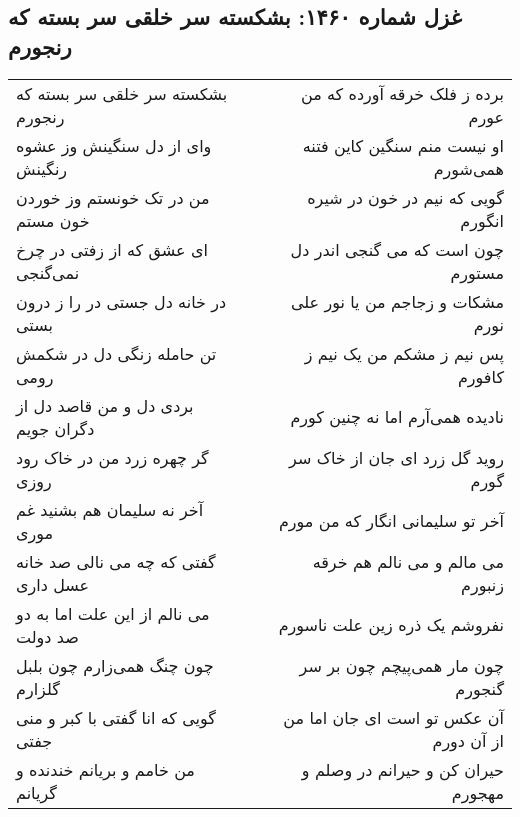 \begin{center}
\section*{غزل شماره ۱۴۶۰: بشکسته سر خلقی سر بسته که رنجورم}
\label{sec:1460}
\begin{longtable}{l p{0.5cm} r}
بشکسته سر خلقی سر بسته که رنجورم
&&
برده ز فلک خرقه آورده که من عورم
\\
وای از دل سنگینش وز عشوه رنگینش
&&
او نیست منم سنگین کاین فتنه همی‌شورم
\\
من در تک خونستم وز خوردن خون مستم
&&
گویی که نیم در خون در شیره انگورم
\\
ای عشق که از زفتی در چرخ نمی‌گنجی
&&
چون است که می گنجی اندر دل مستورم
\\
در خانه دل جستی در را ز درون بستی
&&
مشکات و زجاجم من یا نور علی نورم
\\
تن حامله زنگی دل در شکمش رومی
&&
پس نیم ز مشکم من یک نیم ز کافورم
\\
بردی دل و من قاصد دل از دگران جویم
&&
نادیده همی‌آرم اما نه چنین کورم
\\
گر چهره زرد من در خاک رود روزی
&&
روید گل زرد ای جان از خاک سر گورم
\\
آخر نه سلیمان هم بشنید غم موری
&&
آخر تو سلیمانی انگار که من مورم
\\
گفتی که چه می نالی صد خانه عسل داری
&&
می مالم و می نالم هم خرقه زنبورم
\\
می نالم از این علت اما به دو صد دولت
&&
نفروشم یک ذره زین علت ناسورم
\\
چون چنگ همی‌زارم چون بلبل گلزارم
&&
چون مار همی‌پیچم چون بر سر گنجورم
\\
گویی که انا گفتی با کبر و منی جفتی
&&
آن عکس تو است ای جان اما من از آن دورم
\\
من خامم و بریانم خندنده و گریانم
&&
حیران کن و حیرانم در وصلم و مهجورم
\\
\end{longtable}
\end{center}
